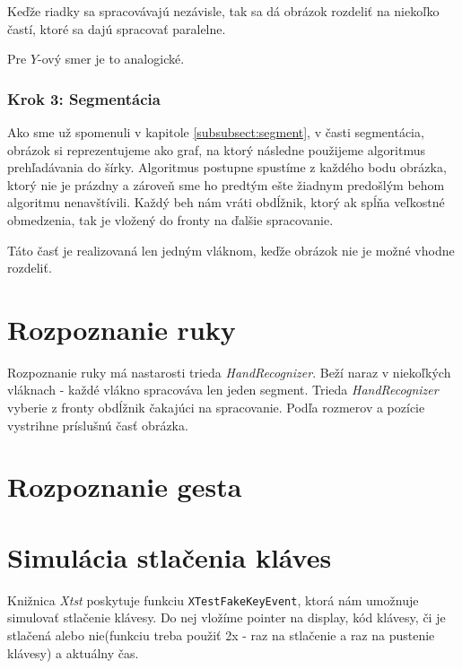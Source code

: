 Keďže riadky sa spracovávajú nezávisle, tak sa dá obrázok rozdeliť na niekoľko častí, ktoré sa dajú spracovať paralelne.

Pre $Y$-ový smer je to analogické. 

\subsubsection{Krok 3: Segmentácia}
Ako sme už spomenuli v kapitole \ref{subsubsect:segment}, v časti segmentácia, obrázok si reprezentujeme ako graf, na ktorý následne použijeme algoritmus prehľadávania do šírky. Algoritmus postupne spustíme z každého bodu obrázka, ktorý nie je prázdny a zároveň sme ho predtým ešte žiadnym predošlým behom algoritmu nenavštívili. Každý beh nám vráti obdĺžnik, ktorý ak spĺňa veľkostné obmedzenia, tak je vložený do fronty na ďalšie spracovanie. 

Táto časť je realizovaná len jedným vláknom, keďže obrázok nie je možné vhodne rozdeliť.

\section{Rozpoznanie ruky}

Rozpoznanie ruky má nastarosti trieda \textit{HandRecognizer}. Beží naraz v niekoľkých vláknach - každé vlákno spracováva len jeden segment.
Trieda \textit{HandRecognizer} vyberie z fronty obdĺžnik čakajúci na spracovanie. Podľa rozmerov a pozície vystrihne príslušnú časť obrázka.


\section{Rozpoznanie gesta}


\section{Simulácia stlačenia kláves}
Knižnica \textit{Xtst} poskytuje funkciu {\tt XTestFakeKeyEvent}, ktorá nám umožnuje simulovať stlačenie klávesy. Do nej vložíme pointer na display, kód klávesy, či je stlačená alebo nie(funkciu treba použiť 2x - raz na stlačenie a raz na pustenie klávesy) a aktuálny čas.